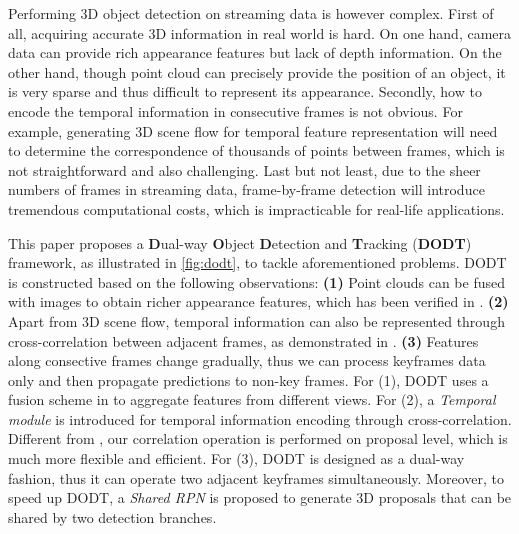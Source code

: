\documentclass[letterpaper, 10pt, conference]{ieeeconf}  %
\begin{document}
Performing 3D object detection on streaming data is however complex. First of all, acquiring accurate 3D information in real world is hard. On one hand, camera data can provide rich appearance features but lack of depth information. On the other hand, though point cloud can precisely provide the position of an object, it is very sparse and thus difficult to represent its appearance. Secondly, how to encode the temporal information in consecutive frames is not obvious. For example, generating 3D scene flow for temporal feature representation will need to determine the correspondence of thousands of points between frames, which is not straightforward and also challenging. Last but not least, due to the sheer numbers of frames in streaming data, frame-by-frame detection will introduce tremendous computational costs, which is impracticable for real-life applications. 

This paper proposes a \textbf{D}ual-way \textbf{O}bject \textbf{D}etection and \textbf{T}racking (\textbf{DODT}) framework, as illustrated in \figurename \ref{fig:dodt}, to tackle aforementioned problems. DODT is constructed based on the following observations: \textbf{(1)} Point clouds can be fused with images to obtain richer appearance features, which has been verified in \cite{chen2017multi, ku2018joint}. \textbf{(2)} Apart from 3D scene flow, temporal information can also be represented through cross-correlation between adjacent frames, as demonstrated in \cite{feichtenhofer2017detect}. \textbf{(3)} Features along consective frames change gradually, thus we can process keyframes data only and then propagate predictions to non-key frames. For (1), DODT uses a fusion scheme in \cite{ku2018joint} to aggregate features from different views. For (2), a \textit{Temporal module} is introduced for temporal information encoding through cross-correlation. Different from \cite{feichtenhofer2017detect, dosovitskiy2015flownet},  our correlation operation is performed on proposal level, which is much more flexible and efficient. For (3), DODT is designed as a dual-way fashion, thus it can operate two adjacent keyframes simultaneously. Moreover, to speed up DODT, a \textit{Shared RPN} is proposed to generate 3D proposals that can be shared by two detection branches.
\end{document}
